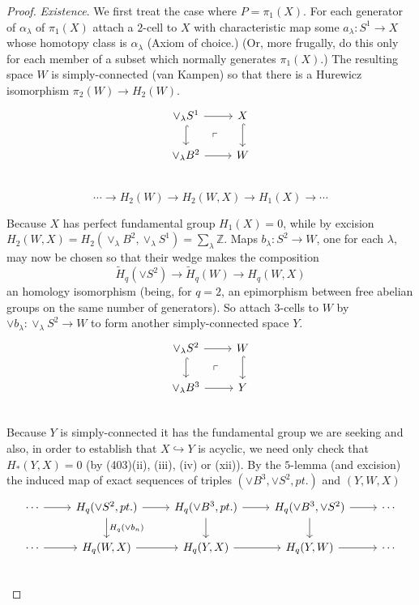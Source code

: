 \documentclass[openany,leqno]{book}  %
\newcommand{\Z}{\mathbb{Z}}
\begin{document}
\begin{proof}
{\em Existence}. We first treat the case where $P = \pi_1(X)$. For each generator of $\alpha_\lambda$ of $\pi_1(X)$ attach a $2$-cell to $X$ with characteristic map some $a_\lambda\colon   S^1 \longrightarrow  X$ whose homotopy class is $\alpha_\lambda$ (Axiom of choice.) (Or, more frugally, do this only for each member of a subset which normally generates $\pi_1(X)$.) The resulting space $W$ is simply-connected (van Kampen) so that there is a Hurewicz isomorphism $\pi_2(W) \longrightarrow  H_2(W)$.
\[
 \begin{tikzcd}
 \vee_\lambda S^1 \arrow[hook]{d} \arrow{r} \arrow[dr, phantom, "\ulcorner"] & 
  X \arrow[hook]{d}\\
 \vee_\lambda B^2 \arrow{r} & W\\
 \end{tikzcd}
 \]
\[\cdots \longrightarrow H_2(W)\longrightarrow H_2(W,X)\longrightarrow H_1(X)\longrightarrow \cdots \]

Because $X$ has perfect fundamental group $H_1(X) = 0$, while by excision $H_2(W,X) = H_2(\vee_\lambda B^2,\vee_\lambda S^1)=\sum_\lambda \Z$. Maps $b_\lambda\colon   S^2\longrightarrow W$, one for each $\lambda$, may now be chosen so that their wedge makes the composition
\[\widetilde{H}_q(\vee S^2) \longrightarrow \widetilde{H}_q(W)\longrightarrow H_q(W,X)\]
an homology isomorphism (being, for $q = 2$, an epimorphism between free abelian groups on the same number of generators). So attach $3$-cells to $W$ by $\vee b_\lambda\colon   \vee_\lambda S^2 \longrightarrow W$ to form another simply-connected space $Y$.
\[
 \begin{tikzcd}
 \vee_\lambda S^2 \arrow[hook]{d} \arrow{r} \arrow[dr, phantom, "\ulcorner"] & 
  W \arrow[hook]{d}\\
 \vee_\lambda B^3 \arrow{r} & Y\\
 \end{tikzcd}
 \]
Because $Y$ is simply-connected it has the fundamental group we are seeking and also, in order to establish that $X\hookrightarrow Y$ is acyclic, we need only check that $H_*(Y, X) = 0$ (by (403)(ii), (iii), (iv) or (xii)). By the $5$-lemma (and excision) the induced map of exact sequences of triples $(\vee B^3, \vee S^2, pt.)$ and $(Y, W, X)$
\[
 \begin{tikzcd}
 \cdots \arrow{r} & H_q(\vee S^2, pt.) \arrow{d}{H_q(\vee b_n)} \arrow{r} & H_q(\vee B^3, pt.) \arrow{d} \arrow{r} &H_q(\vee B^3, \vee S^2) \arrow{d} \arrow{r} &\cdots \\
 \cdots \arrow{r} & H_q(W,X)  \arrow{r} & H_q(Y,X)  \arrow{r} &H_q(Y,W)  \arrow{r} &\cdots \\
 \end{tikzcd}
 \]


\end{proof}
\end{document}
